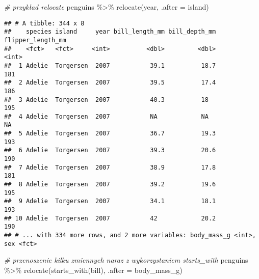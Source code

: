 \documentclass[
]{book}
\newenvironment{Shaded}{\begin{snugshade}}{\end{snugshade}}
\newcommand{\AttributeTok}[1]{\textcolor[rgb]{0.77,0.63,0.00}{#1}}
\newcommand{\CommentTok}[1]{\textcolor[rgb]{0.56,0.35,0.01}{\textit{#1}}}
\newcommand{\FunctionTok}[1]{\textcolor[rgb]{0.00,0.00,0.00}{#1}}
\newcommand{\NormalTok}[1]{#1}
\newcommand{\SpecialCharTok}[1]{\textcolor[rgb]{0.00,0.00,0.00}{#1}}
\newcommand{\StringTok}[1]{\textcolor[rgb]{0.31,0.60,0.02}{#1}}
\begin{document}
\begin{Shaded}
\begin{Highlighting}[]
\CommentTok{\# przykład relocate}
\NormalTok{penguins }\SpecialCharTok{\%\textgreater{}\%} \FunctionTok{relocate}\NormalTok{(year, }\AttributeTok{.after =}\NormalTok{ island)}
\end{Highlighting}
\end{Shaded}

\begin{verbatim}
## # A tibble: 344 x 8
##    species island     year bill_length_mm bill_depth_mm flipper_length_mm
##    <fct>   <fct>     <int>          <dbl>         <dbl>             <int>
##  1 Adelie  Torgersen  2007           39.1          18.7               181
##  2 Adelie  Torgersen  2007           39.5          17.4               186
##  3 Adelie  Torgersen  2007           40.3          18                 195
##  4 Adelie  Torgersen  2007           NA            NA                  NA
##  5 Adelie  Torgersen  2007           36.7          19.3               193
##  6 Adelie  Torgersen  2007           39.3          20.6               190
##  7 Adelie  Torgersen  2007           38.9          17.8               181
##  8 Adelie  Torgersen  2007           39.2          19.6               195
##  9 Adelie  Torgersen  2007           34.1          18.1               193
## 10 Adelie  Torgersen  2007           42            20.2               190
## # ... with 334 more rows, and 2 more variables: body_mass_g <int>, sex <fct>
\end{verbatim}

\begin{Shaded}
\begin{Highlighting}[]
\CommentTok{\# przenoszenie kilku zmiennych naraz z wykorzystaniem starts\_with}
\NormalTok{penguins }\SpecialCharTok{\%\textgreater{}\%} \FunctionTok{relocate}\NormalTok{(}\FunctionTok{starts\_with}\NormalTok{(}\StringTok{\textquotesingle{}bill\textquotesingle{}}\NormalTok{), }\AttributeTok{.after =}\NormalTok{ body\_mass\_g)}
\end{Highlighting}
\end{Shaded}
\end{document}

